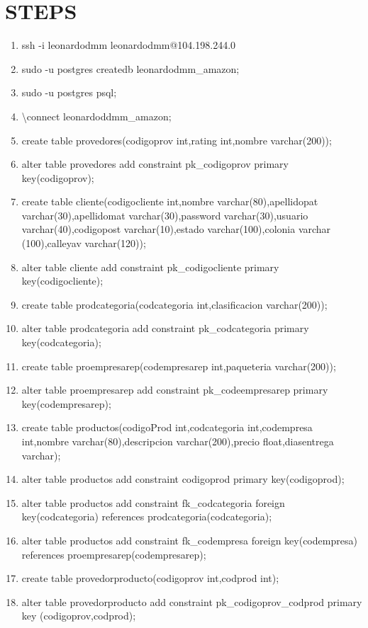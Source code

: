 \documentclass[10pt]{article}         %
\begin{document}
\section{STEPS}
\begin{enumerate}
	\item
	ssh -i leonardodmm leonardodmm@104.198.244.0
	\item
	sudo -u postgres createdb leonardodmm\_amazon;
	\item
	sudo -u postgres psql;
	\item
	\textbackslash connect leonardoddmm\_amazon;
	\item
	create table provedores(codigoprov int,rating int,nombre varchar(200));
	\item
	alter table provedores add constraint pk\_codigoprov primary key(codigoprov);
	\item
	create table cliente(codigocliente int,nombre varchar(80),apellidopat varchar(30),apellidomat varchar(30),password varchar(30),usuario varchar(40),codigopost varchar(10),estado varchar(100),colonia varchar (100),calleyav varchar(120));
	\item
	alter table cliente add constraint pk\_codigocliente primary key(codigocliente);
	\item
	create table prodcategoria(codcategoria int,clasificacion varchar(200));
	\item
	alter table prodcategoria  add constraint pk\_codcategoria primary key(codcategoria);
	\item
	create table proempresarep(codempresarep int,paqueteria varchar(200));
	\item
	alter table proempresarep add constraint pk\_codeempresarep primary key(codempresarep);
	\item
	create table productos(codigoProd int,codcategoria int,codempresa int,nombre varchar(80),descripcion varchar(200),precio float,diasentrega varchar);
	\item
	alter table productos add constraint codigoprod primary key(codigoprod);
	\item
	alter table productos add constraint fk\_codcategoria foreign key(codcategoria)
references prodcategoria(codcategoria);
	\item
	alter table productos add constraint fk\_codempresa foreign key(codempresa) references proempresarep(codempresarep);
	\item
	create table provedorproducto(codigoprov int,codprod int);
	\item
	alter table provedorproducto add constraint pk\_codigoprov\_codprod primary key (codigoprov,codprod);

\end{enumerate}
\end{document}
